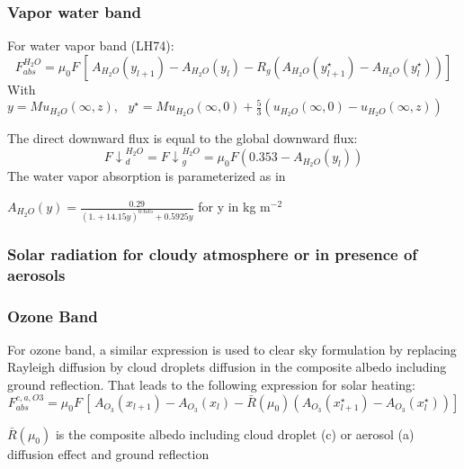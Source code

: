 \subsubsection{Vapor water band}

For water vapor band (LH74):
\begin{equation}
F_{abs}^{H_{2}O}=\mu_{0}F\, [\, A_{H_{2}O}\left( y_{l+1} \right)-A_{H_{2}O}\left(
y_{l} \right)-R_{g}\left( A_{H_{2}O}\left( y_{l+1}^{\star }
\right)-A_{H_{2}O}\left( y_{l}^{\star } \right) \right)]
\end{equation}
\newline
With $y=Mu_{H_{2}O}\left( \infty ,z \right),\, \, \, \, y^{\star
}=Mu_{H_{2}O}\left( \infty ,0 \right)+\frac{5}{3}(u_{H_{2}O}\left( \infty ,0
\right)-u_{H_{2}O}\left( \infty ,z \right))$

The direct downward flux is equal to the global downward flux:
\begin{equation}
{F\downarrow }_{d}^{H_{2}O}={F\downarrow }_{g}^{H_{2}O}=\mu_{0}F\left(
0.353-A_{H_{2}O}\left( y_{l} \right) \right)
\end{equation}
The water vapor absorption is parameterized as in \cite{Yamamoto:1962}

$A_{H_{2}O}\left( y \right)=\frac{0.29}{{(1.+14.15y)}^{0.635}+0.5925y}$ for y in
kg m$^{-2}$

\subsubsection{Solar radiation for cloudy atmosphere or in presence of aerosols}
\subsubsection{Ozone Band}

For ozone band, a similar expression is used to clear sky formulation by
replacing Rayleigh diffusion by cloud droplets diffusion in the composite
albedo including ground reflection. That leads to the following expression
for solar heating:
\begin{equation}
F_{abs}^{c,a,O3}=\mu_{0}F\, [\, A_{O_{3}}\left( x_{l+1} \right)-A_{O_{3}}\left(
x_{l} \right)-\bar{R}(\mu_{0})\left( A_{O_{3}}\left( x_{l+1}^{\star }
\right)-A_{O_{3}}\left( x_{l}^{\star } \right) \right)]
\end{equation}

$\bar{R}(\mu_{0})$ is the composite albedo including cloud droplet (c) or
aerosol (a) diffusion effect and ground reflection

